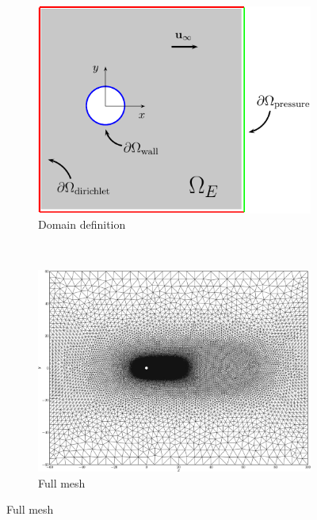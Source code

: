 	\begin{figure}[p]
     \centering
     \begin{subfigure}[t]{0.45\textwidth}
             \includegraphics[width=\textwidth]{figures/eulerian/ISCDomainDefinition-crop.pdf}
             \caption{Domain definition}
             \label{fig:ISCDomainDefinition-crop}
     \end{subfigure}%
     ~ %
     \begin{subfigure}[t]{0.45\textwidth}
             \includegraphics[width=\textwidth]{figures/eulerian/ISC_mesh-crop.png}
             \caption{Full mesh}
             \label{fig:ISC_mesh}
     \end{subfigure}


\end{figure}
